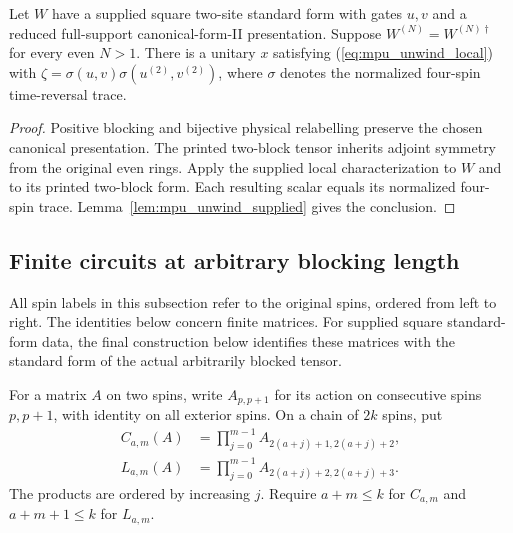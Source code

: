 \begin{lemma}
    \label{lem:mpu_unwind_canonical}
    \leanok
    Let $W$ have a supplied square two-site standard form with gates $u,v$
    and a reduced full-support canonical-form-II presentation. Suppose
    $W^{(N)}=W^{(N)\dagger}$ for every even $N>1$.
    There is a unitary $x$ satisfying (\ref{eq:mpu_unwind_local}) with
    $\zeta=\sigma(u,v)\sigma(u^{(2)},v^{(2)})$, where $\sigma$ denotes
    the normalized four-spin time-reversal trace.
\end{lemma}
\begin{proof}\leanok
    Positive blocking and bijective physical relabelling preserve the
    chosen canonical presentation. The printed two-block tensor inherits
    adjoint symmetry from the original even rings. Apply the supplied
    local characterization to $W$ and to its printed two-block form.
    Each resulting scalar equals its normalized four-spin trace.
    Lemma~\ref{lem:mpu_unwind_supplied} gives the conclusion.
\end{proof}

\subsection{Finite circuits at arbitrary blocking length}

All spin labels in this subsection refer to the original spins, ordered
from left to right. The identities below concern finite matrices. For supplied
square standard-form data, the final construction below identifies these
matrices with the standard form of the actual arbitrarily blocked tensor.

\begin{definition}
    \label{def:mpu_printed_layers}
    \leanok
    For a matrix $A$ on two spins, write $A_{p,p+1}$ for its action on
    consecutive spins $p,p+1$, with identity on all exterior spins.
    On a chain of $2k$ spins, put
    \begin{align*}
        C_{a,m}(A) & =\prod_{j=0}^{m-1}A_{2(a+j)+1,2(a+j)+2}, \\
        L_{a,m}(A) & =\prod_{j=0}^{m-1}A_{2(a+j)+2,2(a+j)+3}.
    \end{align*}
    The products are ordered by increasing $j$. Require $a+m\leq k$
    for $C_{a,m}$ and $a+m+1\leq k$ for $L_{a,m}$.
\end{definition}

